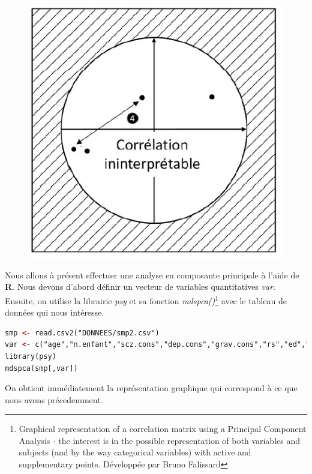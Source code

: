 \begin{figure}[H]\begin{center}\includegraphics[scale=0.5]{ilu/hyperProjdNi.png}\end{center}\end{figure}

Nous allons à présent effectuer une analyse en composante principale à l'aide de \textbf{R}.\newline
Nous devons d'abord définir un vecteur de variables quantitatives \textit{var}. Ensuite, on utilise la librairie \textit{psy} et sa fonction \textit{mdspca()}\footnote{Graphical representation of a correlation matrix using a Principal Component Analysis - the interest is in the possible representation of both variables and subjects (and by the way categorical variables) with active and supplementary points. Développée par Bruno Falissard} avec le tableau de données qui nous intéresse.\newline

\begin{lstlisting}[language=html]
smp <- read.csv2("DONNEES/smp2.csv")
var <- c("age","n.enfant","scz.cons","dep.cons","grav.cons","rs","ed","dr");var
library(psy)
mdspca(smp[,var])
\end{lstlisting}
On obtient immédiatement la représentation graphique qui correspond à ce que nous avons précedemment.

